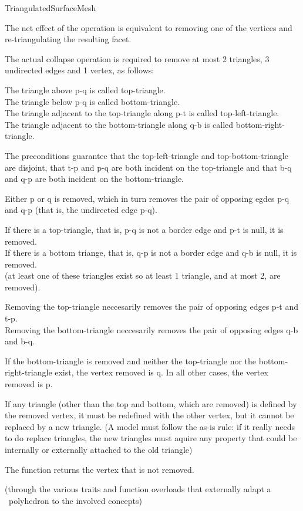 \begin{ccRefConcept}{TriangulatedSurfaceMesh}
{  The net effect of the operation is equivalent to removing one of the vertices
  and re-triangulating the resulting facet.

  The actual collapse operation is required to remove at most 
  2 triangles, 3 undirected edges and 1 vertex, as follows:
  
  The triangle above p-q is called top-triangle.\\
  The triangle below p-q is called bottom-triangle.\\
  The triangle adjacent to the top-triangle along p-t is called top-left-triangle.\\
  The triangle adjacent to the bottom-triangle along q-b is called bottom-right-triangle.
  
  The preconditions guarantee that the top-left-triangle and top-bottom-triangle
  are disjoint, that t-p and p-q are both incident on the top-triangle and that
  b-q and q-p are both incident on the bottom-triangle.
      
  Either p or q is removed, which in turn removes the pair of opposing egdes 
  p-q and q-p (that is, the undirected edge p-q).

  If there is a top-triangle, that is, p-q is not a border edge and p-t is null, it is removed.\\
  If there is a bottom triange, that is, q-p is not a border edge and q-b is null, it is removed.\\
  (at least one of these triangles exist so at least 1 triangle, and at most 2, are removed).
      
  Removing the top-triangle neccesarily removes the pair of opposing edges p-t and t-p.\\
  Removing the bottom-triangle neccesarily removes the pair of opposing edges q-b and b-q.
      
  If the bottom-triangle is removed and neither the top-triangle nor
  the bottom-right-triangle exist, the vertex removed is q. In all other
  cases, the vertex removed is p.
  
  If any triangle (other than the top and bottom, which are removed) is defined by
  the removed vertex, it must be redefined with the other vertex, but it cannot
  be replaced by a new triangle. (A model must follow the as-is rule: if it really
  needs to do replace triangles, the new triangles must aquire any property 
  that could be internally or externally attached to the old triangle)
  
  The function returns the vertex that is not removed.
  }

\ccHasModels
{}
  (through the various traits and function overloads that externally adapt a \cgal\
  polyhedron to the involved concepts)

\end{ccRefConcept}

